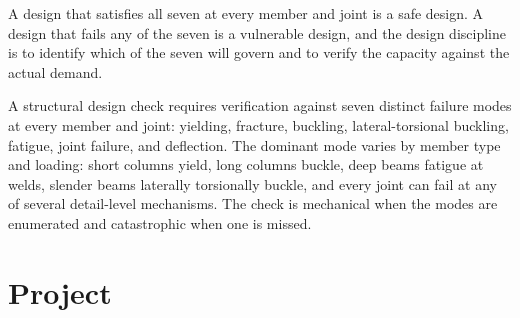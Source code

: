 A design that satisfies all seven at every member and joint is a
safe design. A design that fails any of the seven is a vulnerable
design, and the design discipline is to identify which of the seven
will govern and to verify the capacity against the actual demand.

\begin{principle}
A structural design check requires verification against seven
distinct failure modes at every member and joint: yielding,
fracture, buckling, lateral-torsional buckling, fatigue, joint
failure, and deflection. The dominant mode varies by member type
and loading: short columns yield, long columns buckle, deep beams
fatigue at welds, slender beams laterally torsionally buckle, and
every joint can fail at any of several detail-level mechanisms.
The check is mechanical when the modes are enumerated and
catastrophic when one is missed.
\end{principle}

\section{Project}

